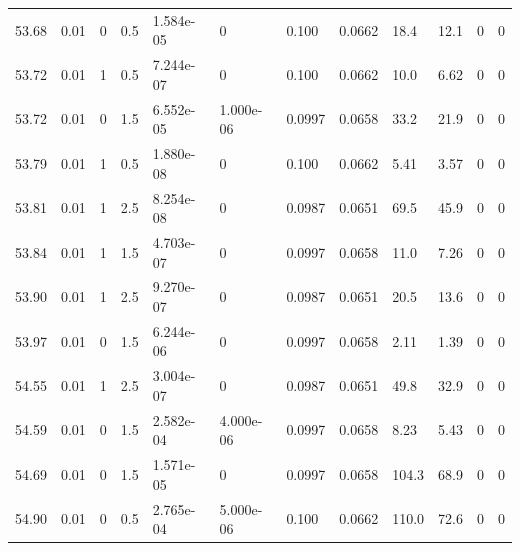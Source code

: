 \documentclass[preview]{standalone}
\begin{document}
{{{{{{{{{{{{\begin{tabular}{L{1.2cm}C{1.2cm} C{0.3cm}C{0.5cm} C{1.4cm}C{1.4cm} C{1.4cm}C{1.4cm} C{1.6cm}C{1.6cm} C{1.6cm}C{1.6cm}}
  53.68  &  0.01  & 0     & 0.5 &  1.584e-05  & 0  &  0.100&   0.0662& 18.4 & 12.1   &  0 & 0  \\ 
  53.72  &  0.01  & 1     & 0.5 &  7.244e-07  & 0  &  0.100&   0.0662& 10.0 & 6.62   &  0 & 0  \\ 
  53.72  &  0.01  & 0     & 1.5 &  6.552e-05  & 1.000e-06  &  0.0997&   0.0658& 33.2 & 21.9   &  0 & 0  \\ 
  53.79  &  0.01  & 1     & 0.5 &  1.880e-08  & 0  &  0.100&   0.0662& 5.41 & 3.57   &  0 & 0  \\ 
  53.81  &  0.01  & 1     & 2.5 &  8.254e-08  & 0  &  0.0987&   0.0651& 69.5 & 45.9   &  0 & 0  \\ 
  53.84  &  0.01  & 1     & 1.5 &  4.703e-07  & 0  &  0.0997&   0.0658& 11.0 & 7.26   &  0 & 0  \\ 
  53.90  &  0.01  & 1     & 2.5 &  9.270e-07  & 0  &  0.0987&   0.0651& 20.5 & 13.6   &  0 & 0  \\ 
  53.97  &  0.01  & 0     & 1.5 &  6.244e-06  & 0  &  0.0997&   0.0658& 2.11 & 1.39   &  0 & 0  \\ 
  54.55  &  0.01  & 1     & 2.5 &  3.004e-07  & 0  &  0.0987&   0.0651& 49.8 & 32.9   &  0 & 0  \\ 
  54.59  &  0.01  & 0     & 1.5 &  2.582e-04  & 4.000e-06  &  0.0997&   0.0658& 8.23 & 5.43   &  0 & 0  \\ 
  54.69  &  0.01  & 0     & 1.5 &  1.571e-05  & 0  &  0.0997&   0.0658& 104.3 & 68.9   &  0 & 0  \\ 
  54.90  &  0.01  & 0     & 0.5 &  2.765e-04  & 5.000e-06  &  0.100&   0.0662& 110.0 & 72.6   &  0 & 0  \\ 
\hline 
\end{tabular} 

}}}}}}}}}}}}
\end{document}
